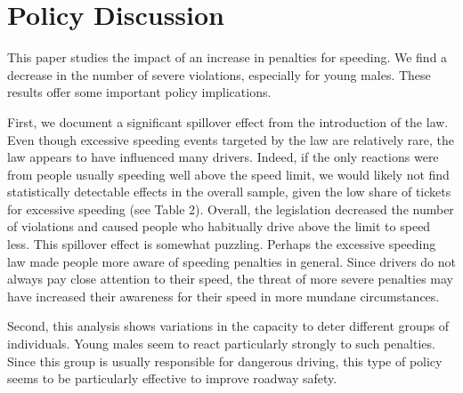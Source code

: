 \section{Policy Discussion}
\label{sec:Discussion}


This paper studies the impact of an increase in penalties for speeding. We find a decrease in the number of severe violations, especially for young males. These results offer some important policy implications.

First, we document a significant spillover effect from the introduction of the law. Even though excessive speeding events targeted by the law are relatively rare, the law appears to have influenced many drivers. Indeed, if the only reactions were from people usually speeding well above the speed limit, we would likely not find statistically detectable effects in the overall sample, given the low share of tickets for excessive speeding (see Table 2). Overall, the legislation decreased the number of violations and caused people who habitually drive above the limit to speed less. This spillover effect is somewhat puzzling. Perhaps the excessive speeding law made people more aware of speeding penalties in general. Since drivers do not always pay close attention to their speed, the threat of more severe penalties may have increased their awareness for their speed in more mundane circumstances.

Second, this analysis shows variations in the capacity to deter different groups of individuals. Young males seem to react particularly strongly to such penalties. Since this group is usually responsible for dangerous driving, this type of policy seems to be particularly effective to improve roadway safety.


%

